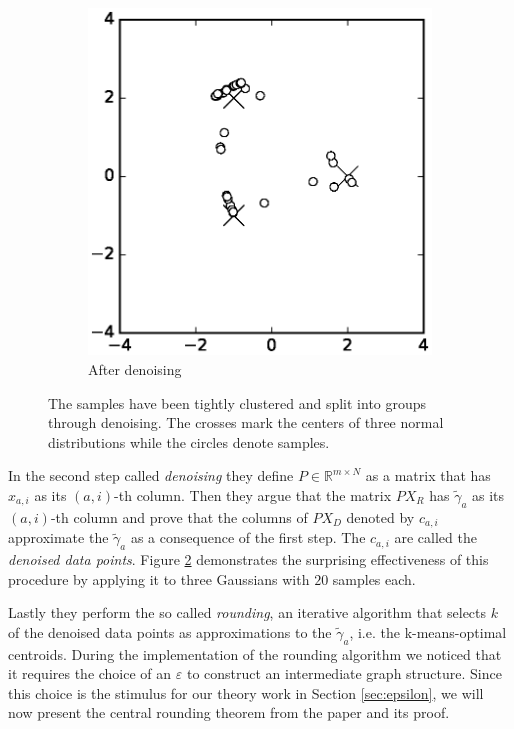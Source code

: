 \documentclass[10pt,a4paper]{article}
\begin{document}
\begin{figure}[h!]
\begin{subfigure}{0.3\textwidth}
    \includegraphics[width=\textwidth]{figures/denoising-denoised}
    \caption{After denoising}
    \label{fig:denoised}
  \end{subfigure}
  \caption{The samples have been tightly clustered and split into groups through denoising. The crosses mark the centers of three normal distributions while the circles denote samples.}
  \label{fig:denoising}
\end{figure}

In the second step called \emph{denoising} they define $P \in \mathbb{R}^{m \times N}$ as a matrix that has $x_{a, i}$ as its $(a, i)$-th column.
Then they argue that the matrix $PX_{R}$ has $\tilde{\gamma}_{a}$ as its $(a, i)$-th column and prove that the columns of $PX_{D}$ denoted by $c_{a, i}$ approximate the $\tilde{\gamma}_{a}$ as a consequence of the first step.
The $c_{a, i}$ are called the \emph{denoised data points}.
Figure \ref{fig:denoising} demonstrates the surprising effectiveness of this procedure by applying it to three Gaussians with $20$ samples each.

Lastly they perform the so called \emph{rounding}, an iterative algorithm that selects $k$ of the denoised data points as approximations to the $\tilde{\gamma}_{a}$, i.e. the k-means-optimal centroids.
During the implementation of the rounding algorithm we noticed that it requires the choice of an $\varepsilon$ to construct an intermediate graph structure.
Since this choice is the stimulus for our theory work in Section \ref{sec:epsilon}, we will now present the central rounding theorem from the paper and its proof.
\end{document}
